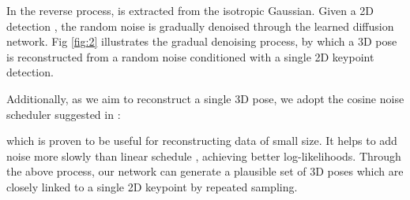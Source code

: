 \documentclass[letterpaper, 10 pt, conference]{ieeeconf}
\begin{document}
In the reverse process,  is extracted from the isotropic Gaussian.
Given a 2D detection , the random noise  is gradually denoised through the learned diffusion network.
Fig \ref{fig:2} illustrates the gradual denoising process, by which a 3D pose is reconstructed from a random noise conditioned with a single 2D keypoint detection.

Additionally, as we aim to reconstruct a single 3D pose, we adopt the cosine noise scheduler suggested in \cite{dhariwal2021diffusion}:

which is proven to be useful for reconstructing data of small size.
It helps to add noise more slowly than linear schedule \cite{ho2020denoising}, achieving better log-likelihoods.
Through the above process, our network can generate a plausible set of 3D poses which are closely linked to a single 2D keypoint by repeated sampling.
\end{document}
